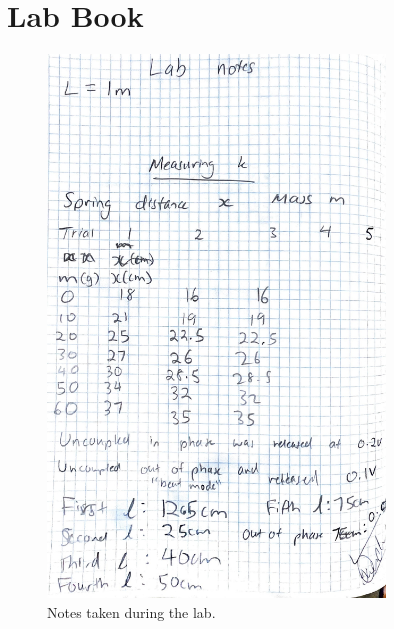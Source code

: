 \documentclass{article}
\begin{document}
\section{Lab Book}
\begin{figure}[h]
    \centering
    \includegraphics[width=0.8\textwidth]{labbook.jpg}
    \caption{Notes taken during the lab.}
\end{figure}
\end{document}
